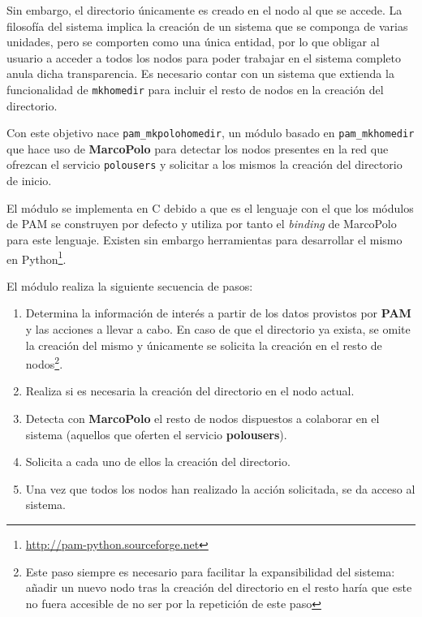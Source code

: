Sin embargo, el directorio únicamente es creado en el nodo al que se accede. La filosofía del sistema implica la creación de un sistema que se componga de varias unidades, pero se comporten como una única entidad, por lo que obligar al usuario a acceder a todos los nodos para poder trabajar en el sistema completo anula dicha transparencia. Es necesario contar con un sistema que extienda la funcionalidad de \texttt{mkhomedir} para incluir el resto de nodos en la creación del directorio.

Con este objetivo nace \texttt{pam\_mkpolohomedir}, un módulo basado en \texttt{pam\_mkhomedir} que hace uso de \textbf{MarcoPolo} para detectar los nodos presentes en la red que ofrezcan el servicio \texttt{polousers} y solicitar a los mismos la creación del directorio de inicio.

El módulo se implementa en C debido a que es el lenguaje con el que los módulos de PAM se construyen por defecto y utiliza por tanto el \textit{binding} de MarcoPolo para este lenguaje. Existen sin embargo herramientas para desarrollar el mismo en Python\footnote{\href{http://pam-python.sourceforge.net/}{http://pam-python.sourceforge.net}}.

El módulo realiza la siguiente secuencia de pasos:

\begin{enumerate}
	\item Determina la información de interés a partir de los datos provistos por \textbf{PAM} y las acciones a llevar a cabo. En caso de que el directorio ya exista, se omite la creación del mismo y únicamente se solicita la creación en el resto de nodos\footnote{Este paso siempre es necesario para facilitar la expansibilidad del sistema: añadir un nuevo nodo tras la creación del directorio en el resto haría que este no fuera accesible de no ser por la repetición de este paso}.
	
	\item Realiza si es necesaria la creación del directorio en el nodo actual.
	
	\item Detecta con \textbf{MarcoPolo} el resto de nodos dispuestos a colaborar en el sistema (aquellos que oferten el servicio \textbf{polousers}).
	
	\item Solicita a cada uno de ellos la creación del directorio.
	
	\item Una vez que todos los nodos han realizado la acción solicitada, se da acceso al sistema.
\end{enumerate}

